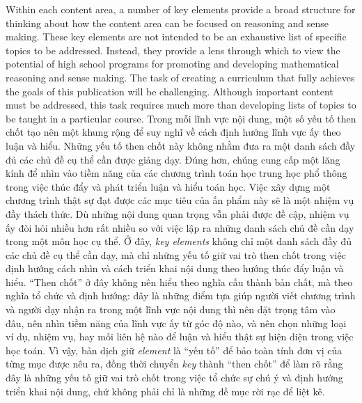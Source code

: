 \documentclass[
  10pt,
  a4paper,
  landscape,
  twoside,
  openany
]{scrbook}
\newcommand{\EN}[1]{#1}
\newcommand{\VI}[1]{#1}
\newcommand{\NOTE}[1]{#1}
\begin{document}
\TriPara
{
\EN{Within each content area, a number of key elements provide a broad structure for thinking about how the content area can be focused on reasoning and sense making. These key elements are not intended to be an exhaustive list of specific topics to be addressed. Instead, they provide a lens through which to view the potential of high school programs for promoting and developing mathematical reasoning and sense making. The task of creating a curriculum that fully achieves the goals of this publication will be challenging. Although important content must be addressed, this task requires much more than developing lists of topics to be taught in a particular course.}
}
{
\VI{Trong mỗi lĩnh vực nội dung, một số yếu tố then chốt tạo nên một khung rộng để suy nghĩ về cách định hướng lĩnh vực ấy theo luận và hiểu. Những yếu tố then chốt này không nhằm đưa ra một danh sách đầy đủ các chủ đề cụ thể cần được giảng dạy. Đúng hơn, chúng cung cấp một lăng kính để nhìn vào tiềm năng của các chương trình toán học trung học phổ thông trong việc thúc đẩy và phát triển luận và hiểu toán học. Việc xây dựng một chương trình thật sự đạt được các mục tiêu của ấn phẩm này sẽ là một nhiệm vụ đầy thách thức. Dù những nội dung quan trọng vẫn phải được đề cập, nhiệm vụ ấy đòi hỏi nhiều hơn rất nhiều so với việc lập ra những danh sách chủ đề cần dạy trong một môn học cụ thể.}
}
{
\NOTE{Ở đây, \emph{key elements} không chỉ một danh sách đầy đủ các chủ đề cụ thể cần dạy, mà chỉ những yếu tố giữ vai trò then chốt trong việc định hướng cách nhìn và cách triển khai nội dung theo hướng thúc đẩy luận và hiểu. ``Then chốt'' ở đây không nên hiểu theo nghĩa cấu thành bản chất, mà theo nghĩa tổ chức và định hướng: đây là những điểm tựa giúp người viết chương trình và người dạy nhận ra trong một lĩnh vực nội dung thì nên đặt trọng tâm vào đâu, nên nhìn tiềm năng của lĩnh vực ấy từ góc độ nào, và nên chọn những loại ví dụ, nhiệm vụ, hay mối liên hệ nào để luận và hiểu thật sự hiện diện trong việc học toán. Vì vậy, bản dịch giữ \emph{element} là ``yếu tố'' để bảo toàn tính đơn vị của từng mục được nêu ra, đồng thời chuyển \emph{key} thành ``then chốt'' để làm rõ rằng đây là những yếu tố giữ vai trò chốt trong việc tổ chức sự chú ý và định hướng triển khai nội dung, chứ không phải chỉ là những đề mục rời rạc để liệt kê.}
}
\end{document}
